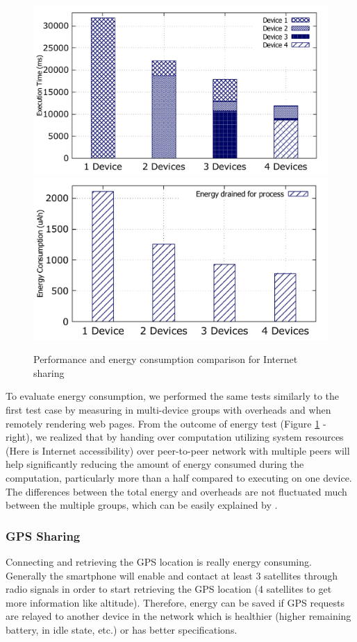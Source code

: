 \documentclass{sig-alternate}
\begin{document}
\begin{figure}
	\centering
		\includegraphics[width=.43\textwidth]{data/net_perf_01.pdf}
		\includegraphics[width=.46\textwidth]{data/net_energy.pdf}
	\caption{Performance and energy consumption comparison for Internet sharing}
	\label{fig:net_clusters_perf}
\end{figure}


To evaluate energy consumption, we performed the same tests similarly to the first test case by measuring in multi-device groups with overheads and when remotely rendering web pages. From the outcome of energy test (Figure \ref{fig:net_clusters_perf} - right), we realized that by handing over computation utilizing system resources (Here is Internet accessibility) over peer-to-peer network with multiple peers will help significantly reducing the amount of energy consumed during the computation, particularly more than a half compared to executing on one device. The differences between the total energy and overheads are not fluctuated much between the multiple groups, which can be easily explained by \cite{wifi_energy}.\\

\subsubsection{GPS Sharing}
Connecting and retrieving the GPS location is really energy consuming. Generally the smartphone will enable and contact at least 3 satellites through radio signals in order to start retrieving the GPS location (4 satellites to get more information like altitude). Therefore, energy can be saved if GPS requests are relayed to another device in the network which is healthier (higher remaining battery, in idle state, etc.) or has better specifications.
\end{document}
